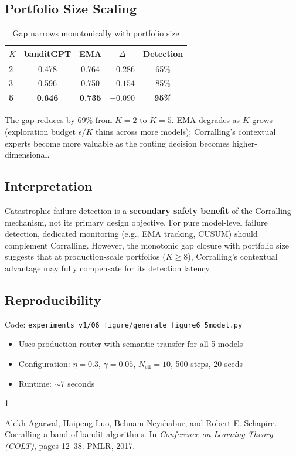 \subsection{Portfolio Size Scaling}

\begin{table}[h]
\centering
\caption{Gap narrows monotonically with portfolio size}
\begin{tabular}{lcccc}
\toprule
$K$ & banditGPT & EMA & $\Delta$ & Detection \\
\midrule
2 & 0.478 & 0.764 & $-0.286$ & 65\% \\
3 & 0.596 & 0.750 & $-0.154$ & 85\% \\
\textbf{5} & \textbf{0.646} & \textbf{0.735} & $\mathbf{-0.090}$ & \textbf{95\%} \\
\bottomrule
\end{tabular}
\end{table}

The gap reduces by 69\% from $K=2$ to $K=5$. EMA degrades as $K$ grows (exploration budget $\epsilon/K$ thins across more models); Corralling's contextual experts become more valuable as the routing decision becomes higher-dimensional.

\subsection{Interpretation}

Catastrophic failure detection is a \textbf{secondary safety benefit} of the Corralling mechanism, not its primary design objective. For pure model-level failure detection, dedicated monitoring (e.g., EMA tracking, CUSUM) should complement Corralling. However, the monotonic gap closure with portfolio size suggests that at production-scale portfolios ($K \geq 8$), Corralling's contextual advantage may fully compensate for its detection latency.

\subsection{Reproducibility}

Code: \texttt{experiments\_v1/06\_figure/generate\_figure6\_5model.py}
\begin{itemize}
    \item Uses production router with semantic transfer for all 5 models
    \item Configuration: $\eta=0.3$, $\gamma=0.05$, $N_{\text{eff}}=10$, 500 steps, 20 seeds
    \item Runtime: $\sim$7 seconds
\end{itemize}


\begin{thebibliography}{1}

Alekh Agarwal, Haipeng Luo, Behnam Neyshabur, and Robert E. Schapire.
\newblock Corralling a band of bandit algorithms.
\newblock In \emph{Conference on Learning Theory (COLT)}, pages 12--38. PMLR, 2017.

\end{thebibliography}
